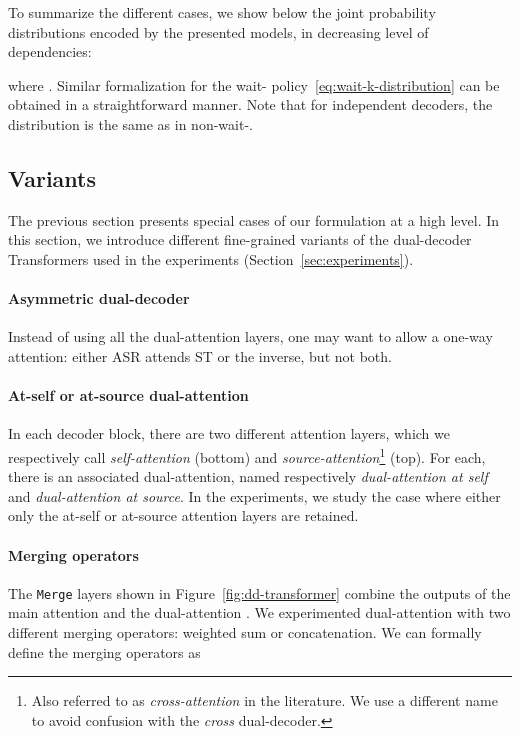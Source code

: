 \documentclass[11pt]{article}
\theoremstyle{plain}
\theoremstyle{definition}
\newcommand{\var}[1]{\texttt{#1}}
\begin{document}
To summarize the different cases, we show
below the joint probability distributions encoded by the presented models, in decreasing level of dependencies: 

where . Similar formalization for the wait- policy~\eqref{eq:wait-k-distribution} can be obtained in a straightforward manner. Note that for independent decoders, the distribution is the same as in non-wait-.

\subsection{Variants}\label{sec:dd-variants}
The previous section presents special cases of our formulation at a high level. In this section, we introduce different fine-grained variants of the dual-decoder Transformers used in the experiments (Section~\ref{sec:experiments}). 






\paragraph{Asymmetric dual-decoder} Instead of using all the dual-attention layers, one may want to allow a one-way attention: either ASR attends ST or the inverse, but not both. 




\paragraph{At-self or at-source dual-attention} In each decoder block, 
there are two different attention layers, which we respectively call \emph{self-attention} (bottom) and \emph{source-attention}\footnote{{Also referred to as \emph{cross-attention} in the literature. We use a different name to avoid confusion with the \emph{cross} dual-decoder.}} (top). For each, there is an associated dual-attention, named respectively \emph{dual-attention at self} and \emph{dual-attention at source}. In the experiments, 
we study the case where either only the at-self or at-source attention layers are retained.


\paragraph{Merging operators}
The \var{Merge} layers shown in Figure~\ref{fig:dd-transformer} combine the outputs of the main attention  and the dual-attention . We experimented dual-attention with two different merging operators: weighted sum or concatenation. We can formally define the merging operators as
\end{document}
